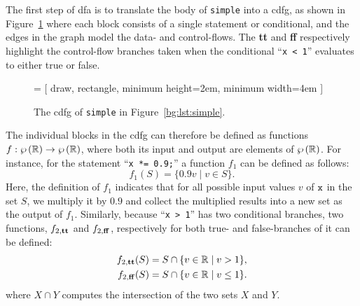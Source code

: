The first step of \gls{dfa} is to translate the body of \verb|simple| into a
\gls{cdfg}, as shown in Figure~\ref{bg:fig:cdfg} where each block consists of
a single statement or conditional, and the edges in the graph model the data-
and control-flows.  The \textbf{tt} and \textbf{ff} respectively highlight the
control-flow branches taken when the conditional \mbox{``\texttt{x < 1}''}
evaluates to either true or false.
\begin{figure}[ht]
    \centering
     = [
        draw, rectangle, minimum height=2em, minimum width=4em
    ]
    \caption{%
        The \acrshort{cdfg} of \texttt{simple} in Figure~\ref{bg:lst:simple}.
    }\label{bg:fig:cdfg}
\end{figure}

The individual blocks in the \gls{cdfg} can therefore be defined as functions
$f: \wp\left({\mathbb{R}}\right) \to \wp\left({\mathbb{R}}\right)$, where both its input and
output are elements of $\wp\left({\mathbb{R}}\right)$.  For instance, for the statement
``\lstinline[basicstyle=\tt]{x *= 0.9;}'' a function $f_1$ can be defined as
follows:
\begin{equation}
    f_1(S) = \{ 0.9 v \mid v \in S \}.
\end{equation}
Here, the definition of $f_1$ indicates that for all possible input values $v$
of $\texttt{x}$ in the set $S$, we multiply it by $0.9$ and collect the multiplied
results into a new set as the output of $f_1$.  Similarly, because ``\texttt{x
> 1}'' has two conditional branches, two functions, $f_{2,\mathbf{tt}}$ and $f_{2,
\mathbf{ff}}$, respectively for both true- and false-branches of it can be
defined:
\begin{equation}
    \begin{aligned}
        f_{2, \mathbf{tt}}(S) &= S \cap \{ v \in \mathbb{R} \mid v > 1 \}, \\
        f_{2, \mathbf{ff}}(S) &= S \cap \{ v \in \mathbb{R} \mid v \leq 1 \}.
    \end{aligned}
\end{equation}
where $X \cap Y$ computes the intersection of the two sets $X$ and $Y$.

